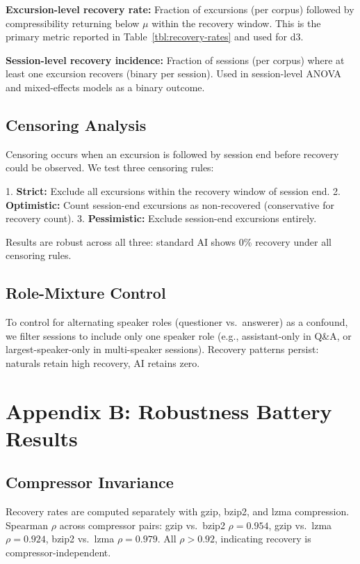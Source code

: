 \documentclass[11pt]{article}
\begin{document}
\textbf{Excursion-level recovery rate:} Fraction of excursions (per corpus) followed by compressibility returning below $\mu$ within the recovery window. This is the primary metric reported in Table~\ref{tbl:recovery-rates} and used for d3.

\textbf{Session-level recovery incidence:} Fraction of sessions (per corpus) where at least one excursion recovers (binary per session). Used in session-level ANOVA and mixed-effects models as a binary outcome.

\subsection{Censoring Analysis}

Censoring occurs when an excursion is followed by session end before recovery could be observed. We test three censoring rules:

1. \textbf{Strict:} Exclude all excursions within the recovery window of session end.
2. \textbf{Optimistic:} Count session-end excursions as non-recovered (conservative for recovery count).
3. \textbf{Pessimistic:} Exclude session-end excursions entirely.

Results are robust across all three: standard AI shows 0\% recovery under all censoring rules.

\subsection{Role-Mixture Control}

To control for alternating speaker roles (questioner vs.\ answerer) as a confound, we filter sessions to include only one speaker role (e.g., assistant-only in Q\&A, or largest-speaker-only in multi-speaker sessions). Recovery patterns persist: naturals retain high recovery, AI retains zero.

\FloatBarrier

\section{Appendix B: Robustness Battery Results}

\subsection{Compressor Invariance}

Recovery rates are computed separately with gzip, bzip2, and lzma compression. Spearman $\rho$ across compressor pairs: gzip vs.\ bzip2 $\rho = 0.954$, gzip vs.\ lzma $\rho = 0.924$, bzip2 vs.\ lzma $\rho = 0.979$. All $\rho > 0.92$, indicating recovery is compressor-independent.
\end{document}
